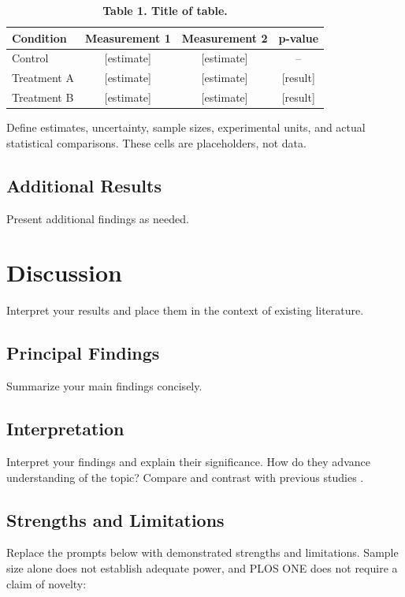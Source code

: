 \documentclass[10pt,letterpaper]{article}
\begin{document}
\begin{table}[!ht]
\centering
\caption{{\bf Table 1. Title of table.}}
\label{tab:results1}
\begin{tabular}{lccc}
\hline
\textbf{Condition} & \textbf{Measurement 1} & \textbf{Measurement 2} & \textbf{p-value} \\
\hline
Control & [estimate] & [estimate] & -- \\
Treatment A & [estimate] & [estimate] & [result] \\
Treatment B & [estimate] & [estimate] & [result] \\
\hline
\end{tabular}
\begin{flushleft}
Define estimates, uncertainty, sample sizes, experimental units, and actual statistical comparisons. These cells are placeholders, not data.
\end{flushleft}
\end{table}

\subsection*{Additional Results}
Present additional findings as needed.

\section*{Discussion}

Interpret your results and place them in the context of existing literature.

\subsection*{Principal Findings}
Summarize your main findings concisely.

\subsection*{Interpretation}
Interpret your findings and explain their significance. How do they advance understanding of the topic? Compare and contrast with previous studies \cite{brown2021,williams2020}.

\subsection*{Strengths and Limitations}
Replace the prompts below with demonstrated strengths and limitations. Sample size alone does not establish adequate power, and PLOS ONE does not require a claim of novelty:
\end{document}
